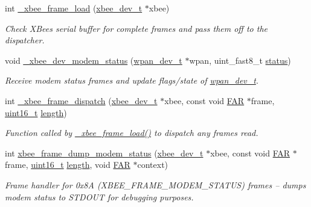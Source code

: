 \begin{DoxyCompactItemize}
int \hyperlink{group__xbee__device_gac0874f9422c6588062a4b6205e989fc6}{\+\_\+xbee\+\_\+frame\+\_\+load} (\hyperlink{structxbee__dev__t}{xbee\+\_\+dev\+\_\+t} $\ast$xbee)
\begin{DoxyCompactList}\small\item\em Check X\+Bee\textquotesingle{}s serial buffer for complete frames and pass them off to the dispatcher. \end{DoxyCompactList}\item 
void \hyperlink{group__xbee__device_gaa9c3bed7ca20dbb2cf4646811c59fe97}{\+\_\+xbee\+\_\+dev\+\_\+modem\+\_\+status} (\hyperlink{structwpan__dev__t}{wpan\+\_\+dev\+\_\+t} $\ast$wpan, uint\+\_\+fast8\+\_\+t \hyperlink{group__xbee__atcmd_gade818037fd6c985038ff29656089758d}{status})
\begin{DoxyCompactList}\small\item\em Receive modem status frames and update flags/state of \hyperlink{structwpan__dev__t}{wpan\+\_\+dev\+\_\+t}. \end{DoxyCompactList}\item 
int \hyperlink{group__xbee__device_gab386cd9e1afe784ab79b3139fe8fc5c8}{\+\_\+xbee\+\_\+frame\+\_\+dispatch} (\hyperlink{structxbee__dev__t}{xbee\+\_\+dev\+\_\+t} $\ast$xbee, const void \hyperlink{group__hal_gaef060b3456fdcc093a7210a762d5f2ed}{F\+AR} $\ast$frame, \hyperlink{group__hal__dos_ga5a8b2dc9e45a9ee81a94ef304fb62505}{uint16\+\_\+t} \hyperlink{group__zdo_gab2b3adeb2a67e656ff030b56727fd0ac}{length})
\begin{DoxyCompactList}\small\item\em Function called by \hyperlink{group__xbee__device_gac0874f9422c6588062a4b6205e989fc6}{\+\_\+xbee\+\_\+frame\+\_\+load()} to dispatch any frames read. \end{DoxyCompactList}\item 
int \hyperlink{group__xbee__device_gae54cdc832021172ae535a449856450b7}{xbee\+\_\+frame\+\_\+dump\+\_\+modem\+\_\+status} (\hyperlink{structxbee__dev__t}{xbee\+\_\+dev\+\_\+t} $\ast$xbee, const void \hyperlink{group__hal_gaef060b3456fdcc093a7210a762d5f2ed}{F\+AR} $\ast$frame, \hyperlink{group__hal__dos_ga5a8b2dc9e45a9ee81a94ef304fb62505}{uint16\+\_\+t} \hyperlink{group__zdo_gab2b3adeb2a67e656ff030b56727fd0ac}{length}, void \hyperlink{group__hal_gaef060b3456fdcc093a7210a762d5f2ed}{F\+AR} $\ast$context)
\begin{DoxyCompactList}\small\item\em Frame handler for 0x8A (X\+B\+E\+E\+\_\+\+F\+R\+A\+M\+E\+\_\+\+M\+O\+D\+E\+M\+\_\+\+S\+T\+A\+T\+US) frames -- dumps modem status to S\+T\+D\+O\+UT for debugging purposes. \end{DoxyCompactList}\item 

\end{DoxyCompactItemize}
